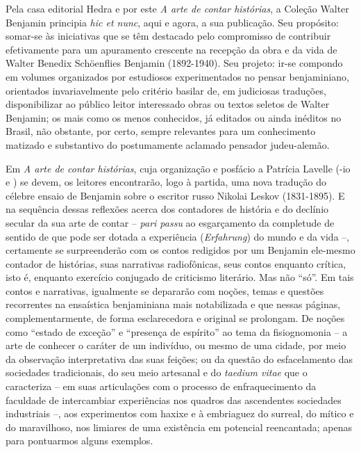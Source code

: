 
Pela casa editorial Hedra e por este \emph{A arte de contar
histórias}, a Coleção Walter Benjamin principia \emph{hic et nunc}, aqui
e agora, a sua publicação. Seu propósito: somar-se às iniciativas que se
têm destacado pelo compromisso de contribuir efetivamente para um
apuramento crescente na recepção da obra e da vida de Walter Benedix
Schöenflies Benjamin (1892-1940). Seu projeto: ir-se compondo em volumes
organizados por estudiosos experimentados no pensar benjaminiano,
orientados invariavelmente pelo critério basilar de, em judiciosas
traduções, disponibilizar ao público leitor interessado obras ou textos
seletos de Walter Benjamin; os mais como os menos conhecidos, já
editados ou ainda inéditos no Brasil, não obstante, por certo, sempre
relevantes para um conhecimento matizado e substantivo do postumamente
aclamado pensador judeu-alemão.

Em \emph{A arte de contar histórias}, cuja organização e posfácio a
Patrícia Lavelle (-io e ) se devem, os leitores encontrarão,
logo à partida, uma nova tradução do célebre ensaio de Benjamin sobre o
escritor russo Nikolai Leskov (1831-1895). E na sequência dessas
reflexões acerca dos contadores de história e do declínio secular da sua
arte de contar -- \emph{pari passu} ao esgarçamento da completude de
sentido de que pode ser dotada a experiência (\emph{Erfahrung}) do mundo
e da vida --, certamente se surpreenderão com os contos redigidos por um
Benjamin ele-mesmo contador de histórias, suas narrativas radiofônicas,
seus contos enquanto crítica, isto é, enquanto exercício conjugado de
criticismo literário. Mas não ``só''. Em tais contos e narrativas,
igualmente se depararão com noções, temas e questões recorrentes na
ensaística benjaminiana mais notabilizada e que nessas páginas,
complementarmente, de forma esclarecedora e original se prolongam. De
noções como ``estado de exceção'' e ``presença de espírito'' ao tema da
fisiognomonia -- a arte de conhecer o caráter de um indivíduo, ou mesmo
de uma cidade, por meio da observação interpretativa das suas feições;
ou da questão do esfacelamento das sociedades tradicionais, do seu meio
artesanal e do \emph{taedium vitae} que o caracteriza -- em suas
articulações com o processo de enfraquecimento da faculdade de
intercambiar experiências nos quadros das ascendentes sociedades
industriais --, aos experimentos com haxixe e à embriaguez do surreal,
do mítico e do maravilhoso, nos limiares de uma existência em potencial
reencantada; apenas para pontuarmos alguns exemplos.


